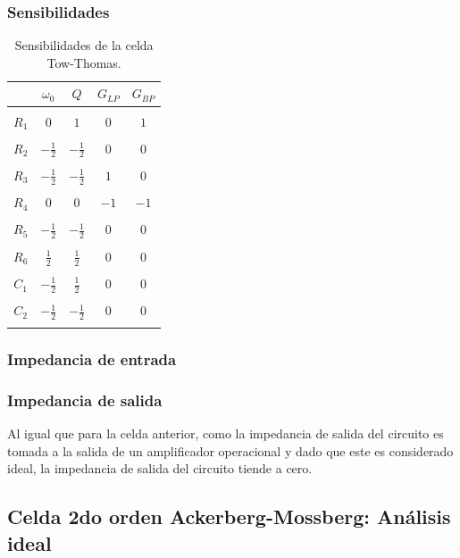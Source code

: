 \subsubsection{Sensibilidades}
\begin{table}[H]
	\centering
	\begin{tabular}{c c c c c }
		& $\omega_0$ & $Q$ &$G_{LP}$ & $G_{BP}$\\
		\hline \\
		$R_1$ & $0$& $1$ & $0$& $1$\\ \\
		$R_2$ & $-\frac{1}{2}$& $-\frac{1}{2}$ & $0$& $0$\\ \\
		$R_3$ & $-\frac{1}{2}$& $-\frac{1}{2}$ & $1$&$0$ \\ \\
		$R_4$ & $0$& $0$& $-1$ &$-1$ \\ \\
		$R_5$ & $-\frac{1}{2}$&$-\frac{1}{2}$ & $0$&$0$ \\ \\
		$R_6$ & $\frac{1}{2}$& $\frac{1}{2}$ & $0$& $0$ \\ \\
		$C_1$ & $-\frac{1}{2}$& $\frac{1}{2}$ & $0$& $0$\\ \\
		$C_2$ & $-\frac{1}{2}$& $-\frac{1}{2}$ & $0$ & $0$\\ \\
		\hline
	\end{tabular}
	\caption{Sensibilidades de la celda Tow-Thomas.}
	\label{sens_tt}
\end{table}

\subsubsection{Impedancia de entrada}

\subsubsection{Impedancia de salida}
Al igual que para la celda anterior, como la impedancia de salida del circuito es tomada a la salida de un amplificador operacional y dado que este es considerado ideal, la impedancia de salida del circuito tiende a cero.

\subsection{Celda 2do orden Ackerberg-Mossberg: An\'alisis ideal}

